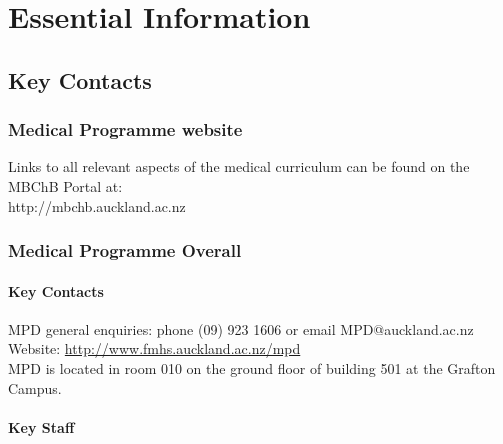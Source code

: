 \documentclass[11pt,fleqn]{book} %
\begin{document}
\pagestyle{fancy} %



\chapter{Essential Information}

\section{Key Contacts}

\subsection{Medical Programme website}
Links to all relevant aspects of the medical curriculum can be found on the MBChB Portal at:\\
http://mbchb.auckland.ac.nz

\subsection{Medical Programme Overall}

\subsubsection{Key Contacts}
MPD general enquiries: phone (09) 923 1606 or email MPD@auckland.ac.nz\\
Website: \url{http://www.fmhs.auckland.ac.nz/mpd}\\
MPD is located in room 010 on the ground floor of building 501 at the Grafton Campus.

\clearpage
\subsubsection{Key Staff}
\end{document}
